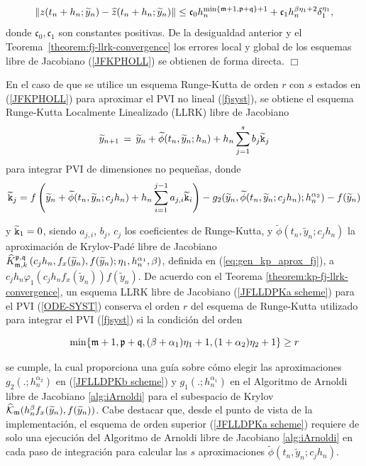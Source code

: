 \begin{equation*}
    \left\lVert z(t_n+h_n;\widetilde{y}_n)-\widehat{z}(t_n+h_n;\widetilde{y}_n) \right\rVert \leq \mathfrak{c}_0 h_n^{\min\{\mathfrak{m}+1,\mathfrak{p}+\mathfrak{q} \}+1} + \mathfrak{c}_1h_n^{\beta\eta_1+2}\delta_1^{\eta_1},
\end{equation*}
donde $\mathfrak{c}_0,\mathfrak{c}_1$ son constantes positivas. De la desigualdad anterior y el Teorema~\ref{theorem:fj-llrk-convergence} los errores local y global de los esquemas libre de Jacobiano (\ref{JFKPHOLL}) se obtienen de forma directa. $\Box$

En el caso de que se utilice un esquema Runge-Kutta de orden $r$ con $s$ estados en (\ref{JFKPHOLL}) para aproximar el PVI no lineal (\ref{fjsyst}), se obtiene el esquema Runge-Kutta Localmente Linealizado (LLRK) libre de Jacobiano
\begin{equation}  \label{JFLLDPKa scheme}
    \widetilde{y}_{n+1}\,=\,\widetilde{y}_n+\widetilde{\phi}(t_n,\widetilde{y}_n;h_n)+h_n \sum_{j=1}^{s}b_j \widetilde{\mathtt{k}}_j
\end{equation}
para integrar PVI de dimensiones no pequeñas, donde
\begin{equation} \label{JFLLDPKb scheme}
    \widetilde{\mathtt{k}}_j = f\left( \widetilde{y}_n+\widetilde{\phi}(t_n,\widetilde{y}_n;c_jh_n)+h_n \sum_{i=1}^{j-1}a_{j,i}\widetilde{\mathtt{k}}_i \right)  - g_2(\widetilde{y}_n,\widetilde{\phi}(t_n,\widetilde{y}_n;c_jh_n);h^{\alpha_2}_n) - f( \widetilde{y}_n)
\end{equation}
\begin{sloppypar}
y $\widetilde{\mathtt{k}}_1=0$, siendo $a_{j,i}$, $b_j$, $c_j$ los coeficientes de Runge-Kutta, y $\widetilde{\phi}(t_n,\widetilde{ y}_n;c_jh_n)$ la aproximación de Krylov-Padé libre de Jacobiano $\widehat{K}_{\mathfrak{m},k}^{\mathfrak{p},\mathfrak{q}}\left(c_jh_n, f_x(\widetilde{y}_n) , f(\widetilde{y}_n) ; \eta_1, h_n^{\alpha_1}, \beta \right)$, definida en (\ref{eq:gen_kp_aprox_fj}), a $c_jh_n\varphi_1(c_jh_nf_x(\widetilde {y}_n))f(\widetilde{y}_n)$. De acuerdo con el Teorema \ref{theorem:kp-fj-llrk-convergence}, un esquema LLRK libre de Jacobiano (\ref{JFLLDPKa scheme}) para el PVI (\ref{ODE-SYST}) conserva el orden $r$ del esquema de Runge-Kutta utilizado para integrar el PVI (\ref{fjsyst}) si la condición del orden
\end{sloppypar}
\begin{equation}\label{order condition}
    \min\{\mathfrak{m}+1,\mathfrak{p}+\mathfrak{q},(\beta+\alpha_1)\eta_1+1,(1+\alpha_2)\eta_2+1\} \geq r
\end{equation}
\begin{sloppypar}
se cumple, la cual proporciona una guía sobre cómo elegir las aproximaciones $g_2(.;h^{\alpha_2}_n)$ en (\ref{JFLLDPKb scheme}) y $g_1(.;h^{\alpha_1}_n)$ en el Algoritmo de Arnoldi libre de Jacobiano \ref{alg:iArnoldi} para el subespacio de Krylov
$\widehat{\mathcal{K}}_{\mathfrak{m}}(h^\beta_n f_x(\widetilde{y}_n),f(\widetilde{y}_n))$. Cabe destacar que, desde el punto de vista de la implementación, el esquema de orden superior (\ref{JFLLDPKa scheme}) requiere de solo una ejecución del Algoritmo de Arnoldi libre de Jacobiano \ref{alg:iArnoldi} en cada paso de integración para calcular las $s$ aproximaciones $ \widetilde{\phi}(t_n,\widetilde{y}_n;c_jh_n)$.
\end{sloppypar}

